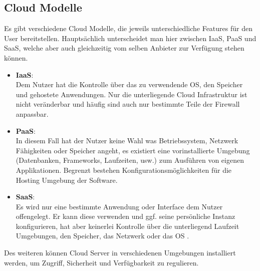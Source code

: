 \subsection{Cloud Modelle}

Es gibt verschiedene Cloud Modelle, die jeweils unterschiedliche Features für den User bereitstellen. Hauptsächlich unterscheidet man hier zwischen \ac{IaaS}, \ac{PaaS} und \ac{SaaS}, welche aber auch gleichzeitig vom selben Anbieter zur Verfügung stehen können.

\begin{itemize}
	\item \textbf{IaaS}:\\
	Dem Nutzer hat die Kontrolle über das zu verwendende OS, den Speicher und gehostete Anwendungen. Nur die unterliegende Cloud Infrastruktur ist nicht veränderbar und häufig sind auch nur bestimmte Teile der Firewall anpassbar.
	\item \textbf{PaaS}:\\
	In diesem Fall hat der Nutzer keine Wahl was Betriebssystem, Netzwerk Fähigkeiten oder Speicher angeht, es existiert eine vorinstallierte Umgebung (Datenbanken, Frameworks, Laufzeiten, usw.) zum Ausführen von eigenen Applikationen. Begrenzt bestehen Konfigurationsmöglichkeiten für die Hosting Umgebung der Software. 
	\item \textbf{SaaS}:\\
	Es wird nur eine bestimmte Anwendung oder Interface dem Nutzer offengelegt. Er kann diese verwenden und ggf. seine persönliche Instanz konfigurieren, hat aber keinerlei Kontrolle über die unterliegend Laufzeit Umgebungen, den Speicher, das Netzwerk oder das OS \parencite[S. 15f]{rafaels.2015}.
\end{itemize}

Des weiteren können Cloud Server in verschiedenen Umgebungen installiert werden, um Zugriff, Sicherheit und Verfügbarkeit zu regulieren.

